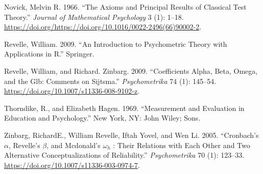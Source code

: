 \documentclass[11pt,]{article}
\begin{document}
\leavevmode\hypertarget{ref-Novick1966}{}%
Novick, Melvin R. 1966. ``The Axioms and Principal Results of Classical
Test Theory.'' \emph{Journal of Mathematical Psychology} 3 (1): 1--18.
\url{https://doi.org/https://doi.org/10.1016/0022-2496(66)90002-2}.

\leavevmode\hypertarget{ref-Revelle2009a}{}%
Revelle, William. 2009. ``An Introduction to Psychometric Theory with
Applications in R.'' Springer.

\leavevmode\hypertarget{ref-Revelle2009}{}%
Revelle, William, and Richard. Zinbarg. 2009. ``Coefficients Alpha,
Beta, Omega, and the Glb: Comments on Sijtsma.'' \emph{Psychometrika} 74
(1): 145--54. \url{https://doi.org/10.1007/s11336-008-9102-z}.

\leavevmode\hypertarget{ref-Thorndike1969}{}%
Thorndike, R., and Elizabeth Hagen. 1969. ``Measurement and Evaluation
in Education and Psychology.'' New York, NY: John Wiley; Sons.

\leavevmode\hypertarget{ref-Zinbarg2005}{}%
Zinbarg, RichardE., William Revelle, Iftah Yovel, and Wen Li. 2005.
``Cronbach's \(\alpha\), Revelle's \(\beta\), and Mcdonald's
\(\omega_h\) : Their Relations with Each Other and Two Alternative
Conceptualizations of Reliability.'' \emph{Psychometrika} 70 (1):
123--33. \url{https://doi.org/10.1007/s11336-003-0974-7}.
\end{document}
